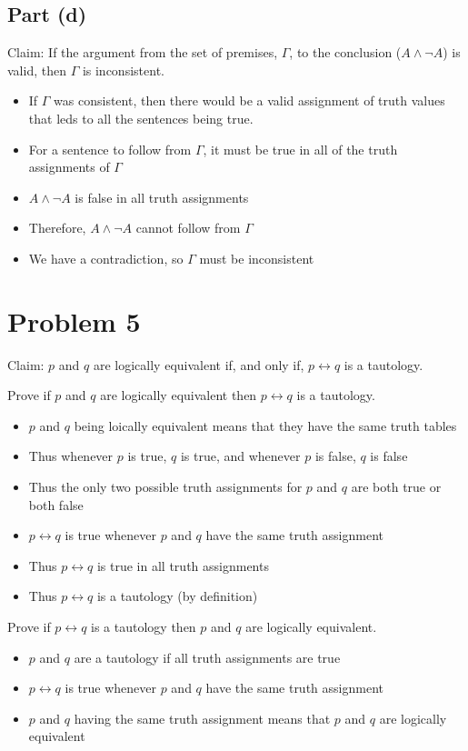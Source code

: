 \documentclass[12pt]{article}
\begin{document}
\subsection*{Part (d)}

Claim: If the argument from the set of premises, $\Gamma$, to the conclusion ($A \land \lnot A$) is valid, then $\Gamma$ is inconsistent. 

\begin{itemize}
    \item If $\Gamma$ was consistent, then there would be a valid assignment of truth values that leds to all the sentences being true. 
    \item For a sentence to follow from $\Gamma$, it must be true in all of the truth assignments of $\Gamma$
    \item $A \land \lnot A$ is false in all truth assignments
    \item Therefore, $A \land \lnot A$ cannot follow from $\Gamma$
    \item We have a contradiction, so $\Gamma$ must be inconsistent
\end{itemize}

\section*{Problem 5}

Claim: $p$ and $q$ are logically equivalent if, and only if, $p \leftrightarrow q$ is a tautology. 



Prove if $p$ and $q$ are logically equivalent then $p \leftrightarrow q$ is a tautology.
\begin{itemize}
    \item $p$ and $q$ being loically equivalent means that they have the same truth tables
    \item Thus whenever $p$ is true, $q$ is true, and whenever $p$ is false, $q$ is false
    \item Thus the only two possible truth assignments for $p$ and $q$ are both true or both false
    \item $p \leftrightarrow q$ is true whenever $p$ and $q$ have the same truth assignment
    \item Thus $p \leftrightarrow q$ is true in all truth assignments
    \item Thus $p \leftrightarrow q$ is a tautology (by definition)
\end{itemize}

Prove if $p \leftrightarrow q$ is a tautology then $p$ and $q$ are logically equivalent.

\begin{itemize}
    \item $p$ and $q$ are a tautology if all truth assignments are true
    \item $p \leftrightarrow q$ is true whenever $p$ and $q$ have the same truth assignment
    \item $p$ and $q$ having the same truth assignment means that $p$ and $q$ are logically equivalent
\end{itemize}
\end{document}
